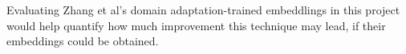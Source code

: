 \documentclass[10pt]{article}
\begin{document}
Evaluating Zhang et al's domain adaptation-trained embeddlings in this project would help quantify how much improvement this technique may lead, if their embeddings could be obtained. 


%
%





{}

%
%	
%
%	
%
%
%
%
%
%
\end{document}
